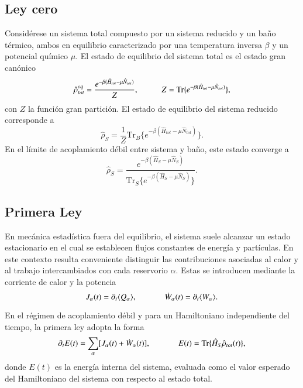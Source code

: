 \subsection{Ley cero}
Considérese un sistema total compuesto por un sistema reducido y un baño térmico, ambos en equilibrio caracterizado por una temperatura inversa $\beta$ y un potencial químico $\mu$. El estado de equilibrio del sistema total es el estado gran canónico
\begin{equation*}
    \hat{\rho}^{eq}_{tot} = \frac{e^{-\beta(\hat{H}_{tot} - \mu \hat{N}_{tot})}}{Z},  
    \hspace{10mm} 
    Z = \text{Tr}\{e^{-\beta(\hat{H}_{tot} - \mu \hat{N}_{tot})} \},
\end{equation*}
con $Z$ la función gran partición. El estado de equilibrio del sistema reducido corresponde a
\begin{equation*}
    \hat{\rho}_{S} = \frac{1}{Z}\text{Tr}_{B}\{ e^{-\beta(\hat{H}_{tot} - \mu \hat{N}_{tot})} \}.
\end{equation*}
En el límite de acoplamiento débil entre sistema y baño, este estado converge a \cite{geva2000second}
\begin{equation*}
    \hat{\rho}_{S} = \frac{e^{-\beta(\hat{H}_{S} - \mu\hat{N}_{S})}}
    {\text{Tr}_{S}\{e^{-\beta(\hat{H}_{S} - \mu \hat{N}_{S})} \} }.
\end{equation*}

\subsection{Primera Ley}
En mecánica estadística fuera del equilibrio, el sistema suele alcanzar un estado estacionario en el cual se establecen flujos constantes de energía y partículas. 
En este contexto resulta conveniente distinguir las contribuciones asociadas al calor y al trabajo intercambiados con cada reservorio $\alpha$. 
Estas se introducen mediante la corriente de calor y la potencia
\begin{equation*}
    J_{\alpha}(t) = \partial_{t}\langle Q_{\alpha}\rangle, 
    \hspace{12mm}  
    \dot{W}_{\alpha}(t) = \partial_{t}\langle W_{\alpha}\rangle.
\end{equation*}


En el régimen de acoplamiento débil y para un Hamiltoniano independiente del tiempo, la primera ley adopta la forma
\begin{equation*}
    \partial_{t}E(t) = \sum_{\alpha}[J_{\alpha}(t) + \dot{W}_{\alpha}(t) ],
    \hspace{12mm}  
    E(t) = \text{Tr}\{\hat{H}_{S}\hat{\rho}_{tot}(t) \},
\end{equation*}
donde $E(t)$ es la energía interna del sistema, evaluada como el valor esperado del Hamiltoniano del sistema con respecto al estado total.

